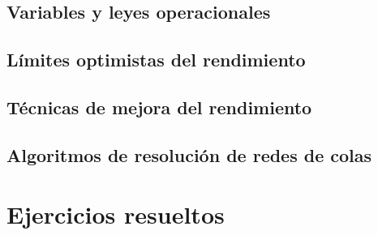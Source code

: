 \documentclass[12pt,spanish]{article}
\begin{document}
\subsection{Variables y leyes operacionales}

\subsection{Límites optimistas del rendimiento}

\subsection{Técnicas de mejora del rendimiento}

\subsection{Algoritmos de resolución de redes de colas}























\section{Ejercicios resueltos}
\end{document}
